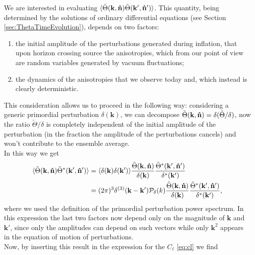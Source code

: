 We are interested in evaluating $\langle\tilde\Theta(\mathbf{k},\mathbf{\hat{n}})\tilde\Theta(\mathbf{k}',\mathbf{\hat{n}}')\rangle$. This quantity, being determined by the solutions of ordinary differential equations (see Section \ref{sec:ThetaTimeEvolution}), depends on two factors:
\begin{enumerate}
    \item the initial amplitude of the perturbations generated during inflation, that upon horizon crossing source the anisotropies, which from our point of view are random variables generated by vacuum fluctuations;
    \item the dynamics of the anisotropies that we observe today and, which instead is clearly deterministic. 
\end{enumerate}
This consideration allows us to proceed in the following way: considering a generic primordial perturbation $\delta(\mathbf{k})$, we can decompose $ \tilde\Theta(\mathbf{k},\mathbf{\hat{n}})=\delta (\tilde\Theta/\delta) $, now the ratio $\tilde\Theta/\delta$ is completely independent of the initial amplitude of the perturbation (in the fraction the amplitude of the perturbations cancels) and won't contribute to the ensemble average.\\
In this way we get
\begin{align*}
    \langle\tilde\Theta(\mathbf{k},\mathbf{\hat{n}})\tilde\Theta^*(\mathbf{k}',\mathbf{\hat{n}}')\rangle &= \langle\delta(\mathbf{k})\delta(\mathbf{k}')\rangle\frac{\tilde\Theta(\mathbf{k},\mathbf{\hat{n}})}{\delta(\mathbf{k})}\frac{\tilde\Theta^*(\mathbf{k}',\mathbf{\hat{n}}')}{\delta^*(\mathbf{k}')}\\
    &= (2\pi)^3\delta^{(3)}(\mathbf{k}-\mathbf{k}')\mathcal P_{\delta}(k)\frac{\tilde\Theta(\mathbf{k},\mathbf{\hat{n}})}{\delta(\mathbf{k})}\frac{\tilde\Theta^*(\mathbf{k}',\mathbf{\hat{n}}')}{\delta^*(\mathbf{k}')},
\end{align*}
where we used the definition of the primordial perturbation power spectrum. In this expression the last two factors now depend only on the magnitude of $\mathbf k$ and $\mathbf k'$, since only the amplitudes can depend on such vectors while only $\mathbf k^2$ appears in the equation of motion of perturbations.\\Now, by inserting this result in the expression for the $C_\ell$ \eqref{eq:cl} we find 
